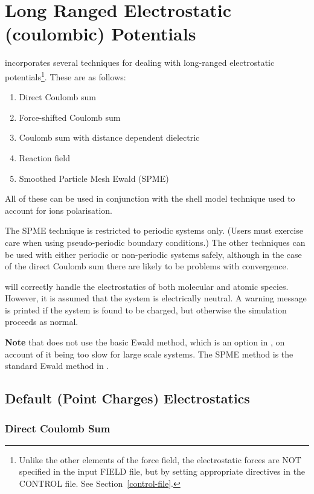 \section{Long Ranged Electrostatic (coulombic) Potentials}
\label{coulomb}

\D incorporates several techniques for dealing with long-ranged
electrostatic potentials\footnote{Unlike the
other elements of the force field, the electrostatic forces are
NOT specified in the input FIELD file, but by setting appropriate
directives in the CONTROL file.  See Section~\ref{control-file}.}.
These are as follows:
\begin{enumerate}
\item Direct Coulomb sum
\item Force-shifted Coulomb sum
\item Coulomb sum with distance dependent dielectric
\item Reaction field
\item Smoothed Particle Mesh Ewald (SPME)
\end{enumerate}
All of these can be used in conjunction with the shell
model technique used to
account for ions polarisation.

The SPME technique is restricted to periodic systems only. (Users
must exercise care when using pseudo-periodic boundary
conditions.)  The other techniques can
be used with either periodic or non-periodic systems safely,
although in the case of the direct Coulomb sum there are likely to be problems with convergence.

\D will correctly handle the electrostatics of both molecular and
atomic species.  However, it is assumed that the system is
electrically neutral.  A warning message is printed if the system
is found to be charged, but otherwise the simulation proceeds as
normal.

{\bf Note} that \D does not use the basic Ewald method, which is an
option in \C, on account of it being too slow for large
scale systems.  The SPME method is the standard Ewald method in \D.

\subsection{Default (Point Charges) Electrostatics}

\subsubsection{Direct Coulomb Sum}

